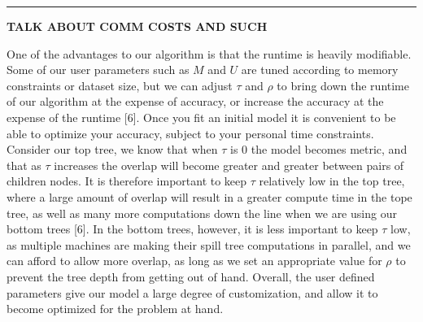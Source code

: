 \noindent\rule{12.1cm}{0.4pt}

\vspace{5 mm}
\noindent
\textbf{TALK ABOUT COMM COSTS AND SUCH}

\vspace{5 mm}
\noindent
One of the advantages to our algorithm is that the runtime is heavily 
modifiable.  Some of our user parameters such as $M$ and $U$ are tuned according
to memory constraints or dataset size, but we can adjust $\tau$ and $\rho$ to 
bring down the runtime of our algorithm at the expense of accuracy, or increase 
the accuracy at the expense of the runtime [6].  Once you fit an initial model it is 
convenient to be able to optimize your accuracy, subject to your personal time 
constraints.  Consider our top tree, we know that when $\tau$ is 0 the model 
becomes metric, and that as $\tau$ increases the overlap will become greater and 
greater between pairs of children nodes.  It is therefore important to keep 
$\tau$ relatively low in the top tree, where a large amount of overlap will 
result in a greater compute time in the tope tree, as well as many more 
computations down the line when we are using our bottom trees [6].  In the bottom 
trees, however, it is less important to keep $\tau$ low, as multiple machines 
are making their spill tree computations in parallel, and we can afford to allow 
more overlap, as long as we set an appropriate value for $\rho$ to prevent the 
tree depth from getting out of hand.  Overall, the user defined parameters give 
our model a large degree of customization, and allow it to become optimized for 
the problem at hand.
